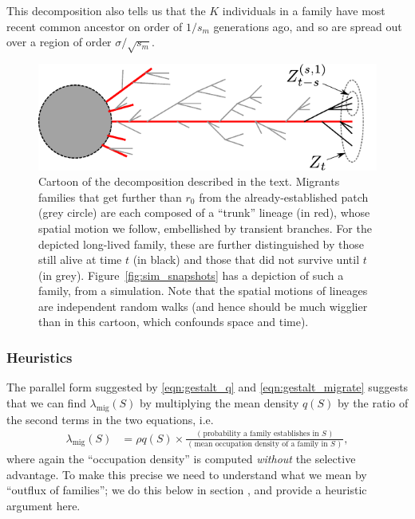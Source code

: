 \documentclass{article}
\newcommand{\revpoint}[2]{}
\newcommand{\migrate}{\lambda_\text{mig}}
\newcommand{\secref}[1]{{\emph{\nameref{#1}}}}
\begin{document}
This decomposition also tells us
that the $K$ individuals in a family
have most recent common ancestor on order of $1/s_m$ generations ago,
and so are spread out over a region of order $\sigma/\sqrt{s_m}$.  \revpoint{2}{2}

\begin{figure}[ht!!]
  \begin{center}
    \includegraphics{branching-concept}
  \end{center}
\caption{Cartoon of the decomposition described in the text. 
Migrants families that get further than $r_0$ from the already-established patch (grey circle)
are each composed of a ``trunk'' lineage (in red), whose spatial motion we follow,
embellished by transient branches.
For the depicted long-lived family, these are further distinguished by those still alive at time $t$ (in black)
and those that did not survive until $t$ (in grey).
Figure~\ref{fig:sim_snapshots} has a depiction of such a family, from a simulation. 
Note that the spatial motions of lineages are independent random walks
(and hence should be much wigglier than in this cartoon, which confounds space and time).
} \label{fig:branching_decomp}
\end{figure}


\subsubsection{Heuristics}
\label{ss:heuristics}

The parallel form suggested by \eqref{eqn:gestalt_q} and \eqref{eqn:gestalt_migrate}
suggests that we can find $\migrate(S)$ by multiplying the mean density $q(S)$
by the ratio of the second terms in the two equations,
i.e.
\begin{align} \label{eqn:ratio_gestalt}
  \migrate(S) 
    &= \rho q(S) \times 
    \frac{
        \text{ ( probability a family establishes in $S$ ) }
    }{
        \text{ ( mean occupation density of a family in $S$ ) }
    } ,
\end{align}
where again the ``occupation density'' is computed \emph{without} the selective advantage.
To make this precise we need to understand what we mean by ``outflux of families'';
we do this below in section \secref{ss:hitting_occupation},
and provide a heuristic argument here.
\end{document}
